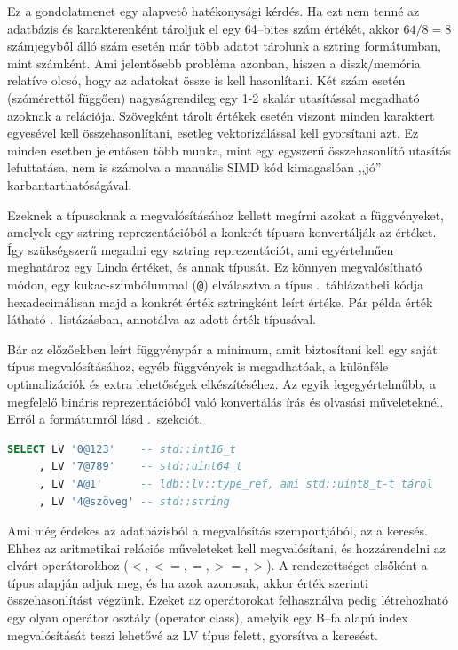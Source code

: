Ez a gondolatmenet egy alapvető hatékonysági kérdés.
Ha ezt nem tenné az adatbázis és karakterenként tároljuk el egy 64--bites szám értékét, akkor $64/8 = 8$ számjegyből álló szám esetén már több adatot tárolunk a sztring formátumban, mint számként.
Ami jelentősebb probléma azonban, hiszen a \hbox{diszk/memória} relatíve olcsó, hogy az adatokat össze is kell hasonlítani.
Két szám esetén (szómérettől függően) nagyságrendileg egy 1-2 skalár utasítással megadható azoknak a relációja.
Szövegként tárolt értékek esetén viszont minden karaktert egyesével kell összehasonlítani, esetleg vektorizálással kell gyorsítani azt.
Ez minden esetben jelentősen több munka, mint egy egyszerű összehasonlító utasítás lefuttatása, nem is számolva a manuális \ac{SIMD} kód kimagaslóan ,,jó'' karbantarthatóságával.

Ezeknek a típusoknak a megvalósításához kellett megírni azokat a függvényeket, amelyek egy sztring reprezentációból a konkrét típusra konvertálják az értéket.
Így szükségszerű megadni egy sztring reprezentációt, ami egyértelműen meghatároz egy Linda értéket, és annak típusát.
Ez könnyen megvalósítható módon, egy kukac-szimbólummal (\texttt{@}) elválasztva a típus .~táblázatbeli kódja hexadecimálisan majd a konkrét érték sztringként leírt értéke.
Pár példa érték látható .~listázásban, annotálva az adott érték típusával.

Bár az előzőekben leírt függvénypár a minimum, amit biztosítani kell egy saját típus megvalósításához, egyéb függvények is megadhatóak, a különféle optimalizációk és extra lehetőségek elkészítéséhez.
Az egyik legegyértelműbb, a megfelelő bináris reprezentációból való konvertálás írás és olvasási műveleteknél.
Erről a formátumról lásd .~szekciót.

\begin{lstlisting}[language=SQL, label=lst:custom-sql-type, caption={Saját típus támogatás PostgreSQL--ben}]
SELECT LV '0@123'    -- std::int16_t
     , LV '7@789'    -- std::uint64_t
     , LV 'A@1'      -- ldb::lv::type_ref, ami std::uint8_t-t tárol
     , LV '4@szöveg' -- std::string
\end{lstlisting}

Ami még érdekes az adatbázisból a megvalósítás szempontjából, az a keresés.
Ehhez az aritmetikai relációs műveleteket kell megvalósítani, és hozzárendelni az elvárt operátorokhoz ($<, <=, =, >=, >$).
A rendezettséget elsőként a típus alapján adjuk meg, és ha azok azonosak, akkor érték szerinti összehasonlítást végzünk.
Ezeket az operátorokat felhasználva pedig létrehozható egy olyan \un operátor osztály (operator class), amelyik egy B--fa alapú index megvalósítását teszi lehetővé az LV típus felett, gyorsítva a keresést.

